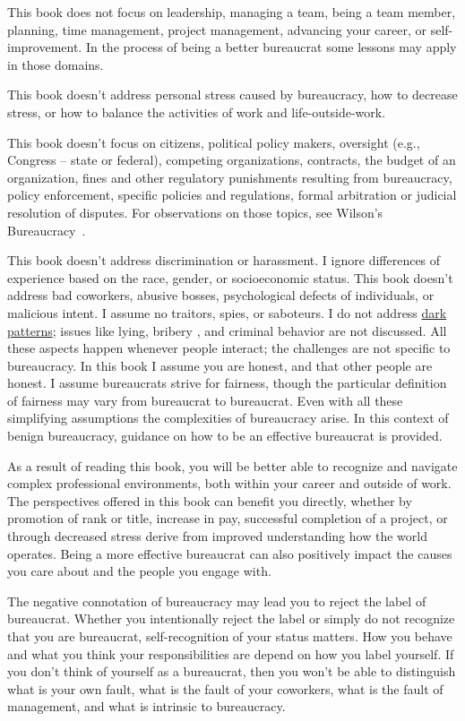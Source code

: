This book does not focus on leadership, managing a team, being a team member, planning, time management, project management, advancing your career, or self-improvement. In the process of being a better bureaucrat some lessons may apply in those domains.

This book doesn't address personal stress caused by bureaucracy, how to decrease stress, or how to balance the activities of work and life-outside-work. 


This book doesn't focus on citizens, political policy makers, oversight (e.g., Congress -- state or federal), competing organizations, contracts, the budget of an organization, fines and other regulatory punishments resulting from bureaucracy, policy enforcement, specific policies and regulations, formal arbitration or judicial resolution of disputes. For observations on those topics, see Wilson's Bureaucracy~\cite{1991_Wilson}.

This book doesn't address discrimination or harassment. I ignore differences of experience based on the race, gender, or socioeconomic status. This book doesn't address bad coworkers, abusive bosses, psychological defects of individuals, or malicious intent. I assume no traitors, spies, or saboteurs. I do not address \href{https://en.wikipedia.org/wiki/Dark_pattern}{dark patterns}; issues like lying, bribery \cite{2021_Ang}, and criminal behavior are not discussed. All these aspects happen whenever people interact; the challenges are not specific to bureaucracy. In this book I assume you are honest, and that other people are honest.  
I assume bureaucrats strive for fairness, though the particular definition of fairness may vary from bureaucrat to bureaucrat. 
Even with all these simplifying assumptions the complexities of bureaucracy arise. In this context of benign bureaucracy, guidance on how to be an effective bureaucrat is provided.


As a result of reading this book, you will be better able to recognize and navigate complex professional environments, both within your career and outside of work. The perspectives offered in this book can benefit you directly, whether by promotion of rank or title, increase in pay, successful completion of a project, or through decreased stress derive from improved understanding how the world operates. Being a more effective bureaucrat can also positively impact the causes you care about and the people you engage with.

The negative connotation of bureaucracy may lead you to reject the label of bureaucrat. Whether you intentionally reject the label or simply do not recognize that you are bureaucrat, self-recognition of your status matters. How you behave and what you think your responsibilities are depend on how you label yourself.
If you don't think of yourself as a bureaucrat, then you won't be able to distinguish what is your own fault, what is the fault of your coworkers, what is the fault of management, and what is intrinsic to bureaucracy. 


